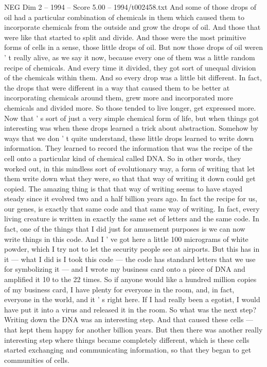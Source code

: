 \begin{textsample}{NEG Dim 2 – 1994 – Score 5.00 – 1994/t002458.txt}
And some of those drops of oil had a particular combination of chemicals in them which caused them to incorporate chemicals from the outside and grow the drops of oil.
And those that were like that started to split and divide.
And those were the most primitive forms of cells in a sense, those little drops of oil.
But now those drops of oil weren ' t really alive, as we say it now, because every one of them was a little random recipe of chemicals.
And every time it divided, they got sort of unequal division of the chemicals within them.
And so every drop was a little bit different.
In fact, the drops that were different in a way that caused them to be better at incorporating chemicals around them, grew more and incorporated more chemicals and divided more.
So those tended to live longer, get expressed more.
Now that ' s sort of just a very simple chemical form of life, but when things got interesting was when these drops learned a trick about abstraction.
Somehow by ways that we don ' t quite understand, these little drops learned to write down information.
They learned to record the information that was the recipe of the cell onto a particular kind of chemical called DNA.
So in other words, they worked out, in this mindless sort of evolutionary way, a form of writing that let them write down what they were, so that that way of writing it down could get copied.
The amazing thing is that that way of writing seems to have stayed steady since it evolved two and a half billion years ago.
In fact the recipe for us, our genes, is exactly that same code and that same way of writing.
In fact, every living creature is written in exactly the same set of letters and the same code.
In fact, one of the things that I did just for amusement purposes is we can now write things in this code.
And I ' ve got here a little 100 micrograms of white powder, which I try not to let the security people see at airports.
But this has in it — what I did is I took this code — the code has standard letters that we use for symbolizing it — and I wrote my business card onto a piece of DNA and amplified it 10 to the 22 times.
So if anyone would like a hundred million copies of my business card, I have plenty for everyone in the room, and, in fact, everyone in the world, and it ' s right here.
If I had really been a egotist, I would have put it into a virus and released it in the room.
So what was the next step?
Writing down the DNA was an interesting step.
And that caused these cells — that kept them happy for another billion years.
But then there was another really interesting step where things became completely different, which is these cells started exchanging and communicating information, so that they began to get communities of cells.

\end{textsample}
